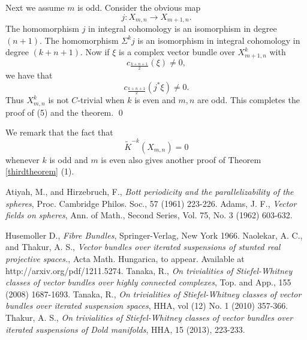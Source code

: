 \documentclass[12pt,reqno]{amsart}
\numberwithin{equation}{subsection}
\theoremstyle{definition}
\begin{document}
Next we assume $m$ is odd. Consider the obvious map 
$$j: X_{m,n}\longrightarrow X_{m+1,n}.$$
The homomorphism $j$ in integral cohomology is an isomorphism in degree $(n+1)$. The homomorphism $\Sigma^kj$ is an isomorphism in integral cohomology in degree $(k+n+1)$. Now if $\xi$ is a complex vector bundle over $X^k_{m+1,n}$ with $$c_{\frac{k+n+1}{2}}(\xi)\neq 0,$$ we have that $$c_{\frac{k+n+1}{2}}(j^*\xi)\neq 0.$$ 
Thus $X^k_{m,n}$ is not $C$-trivial when $k$ is even and $m,n$ are odd.  This completes the proof of (5) and the theorem. 
\qed

We remark that the fact that 
$$\widetilde{K}^{-k}(X_{m,n})=0$$
whenever $k$ is odd and $m$ is even also gives another proof of Theorem\,\ref{thirdtheorem} (1). 

 

\begin{thebibliography}{99}

 Atiyah, M., and Hirzebruch, F., {\em Bott periodicity and the parallelizability of the spheres},  Proc. Cambridge Philos. Soc., 57 (1961)  223-226. 
 Adams, J. F., {\em Vector fields on spheres}, Ann. of Math., Second Series, Vol. 75, No. 3 (1962) 603-632. 

 Husemoller D., {\em Fibre Bundles}, Springer-Verlag, New York 1966. 
 Naolekar, A. C., and Thakur, A. S., {\em Vector bundles over iterated suspensions of stunted real projective spaces.}, Acta Math. Hungarica, to appear. Available at http://arxiv.org/pdf/1211.5274.
 Tanaka, R., {\em On trivialities of Stiefel-Whitney classes of vector bundles over highly connected complexes}, Top. and App., 155 (2008)  1687-1693.
 Tanaka, R., {\em On trivialities of Stiefel-Whitney classes of vector bundles over iterated suspension spaces}, HHA, vol (12) No. 1 (2010) 357-366. 
 Thakur, A. S., {\em On trivialities of Stiefel-Whitney classes of vector bundles over iterated suspensions of Dold manifolds}, HHA, 15 (2013), 223-233.

\end{thebibliography}
\end{document}
